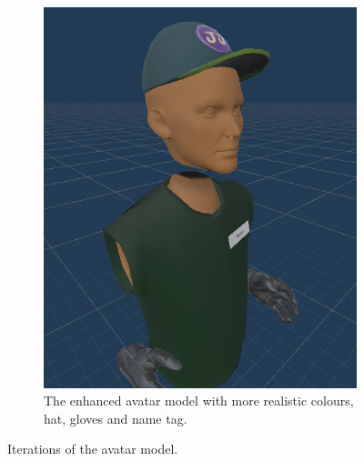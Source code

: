 \begin{figure}[]
\begin{subfigure}[b]{0.4\textwidth}
    \includegraphics[width=1\textwidth]{fig/phase_2/implementation/avatarModel.PNG}
    \caption{The enhanced avatar model with more realistic colours, hat, gloves and name tag.}
    \label{fig:newAvatar}
  \end{subfigure}
  \hfill%
  \caption{Iterations of the avatar model.}
  \label{fig:phase2Avatars}
\end{figure}


